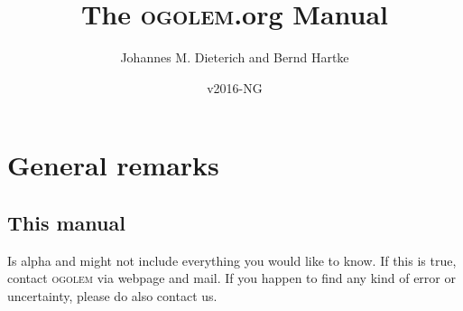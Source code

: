 \documentclass[a4paper,10pt]{scrbook}
\author{Johannes M. Dieterich and Bernd Hartke}
\title{The \textsc{ogolem}.org Manual}
\date{v2016-NG}
\newcommand{\ogo}{\textsc{ogolem}}
\begin{document}
\maketitle

\tableofcontents



\chapter{General remarks}
\section{This manual}
Is alpha and might not include everything you would like to know. If this is
true, contact \ogo{} via webpage and mail. If you happen to find any kind of
error or uncertainty, please do also contact us.
\end{document}
